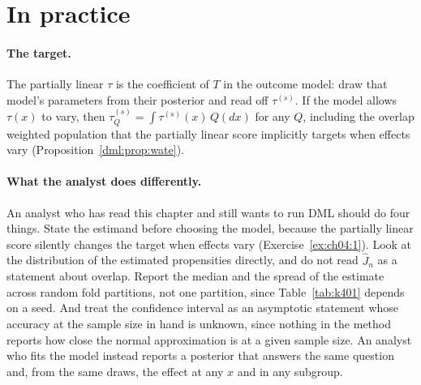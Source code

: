\section{In practice}

\paragraph{The target.} The partially linear $\tau$ is the coefficient of $T$ in the outcome model: draw that model's parameters from their posterior and read off $\tau^{(s)}$. If the model allows $\tau(x)$ to vary, then $\tau_Q^{(s)} = \int \tau^{(s)}(x)\,Q(dx)$ for any $Q$, including the overlap weighted population that the partially linear score implicitly targets when effects vary (Proposition~\ref{dml:prop:wate}).

\paragraph{What the analyst does differently.} An analyst who has read this chapter and still wants to run DML should do four things. State the estimand before choosing the model, because the partially linear score silently changes the target when effects vary (Exercise~\ref{ex:ch04:1}). Look at the distribution of the estimated propensities directly, and do not read $\hat J_n$ as a statement about overlap. Report the median and the spread of the estimate across random fold partitions, not one partition, since Table~\ref{tab:k401} depends on a seed. And treat the confidence interval as an asymptotic statement whose accuracy at the sample size in hand is unknown, since nothing in the method reports how close the normal approximation is at a given sample size. An analyst who fits the model instead reports a posterior that answers the same question and, from the same draws, the effect at any $x$ and in any subgroup.

